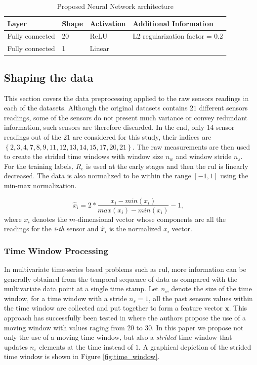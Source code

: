 \begin{table}[!htb]
\centering
\begin{tabular}{l l l l}
	\hline
	Layer & Shape & Activation & Additional Information\\
  	\hline
  	Fully connected & 20 & ReLU & L2 regularization factor = 0.2\\
  	Fully connected & 1 & Linear & \\
  	\hline
\end{tabular}
\caption{Proposed Neural Network architecture}
\label{table:proposed_nn}
\end{table}

\subsection{Shaping the data}

This section covers the data preprocessing applied to the raw sensors readings in each of the datasets. Although the original datasets contains $21$ different sensors readings, some of the sensors do not present much variance or convey redundant information, such sensors are therefore discarded. In the end, only $14$ sensor readings out of the $21$ are considered for this study, their indices are $\left\lbrace 2, 3, 4, 7, 8, 9, 11, 12, 13, 14, 15, 17, 20, 21 \right\rbrace$. The raw measurements are then used to create the strided time windows with window size $n_w$ and window stride $n_s$. For the training labels, $R_e$ is used at the early stages and then the \gls{rul} is linearly decreased. The data is also normalized to be within the range $\left[ -1,1 \right]$ using the min-max normalization.

\begin{equation}
\hat{x}_i = 2* \frac{x_i - min(x_i)}{max(x_i) - min(x_i)} - 1,
\label{eq:min_max_norm}
\end{equation}
where $x_i$ denotes the $m$-dimensional vector whose components are all the readings for the \textit{i-th} sensor and $\hat{x}_i$ is the normalized $x_i$ vector.

\subsubsection{Time Window Processing}

In multivariate time-series based problems such as \gls{rul}, more information can be generally obtained from the temporal sequence of data as compared with the multivariate data point at a single time stamp. Let $n_w$ denote the size of the time window, for a time window with a stride $n_s = 1$, all the past sensors values within the time window are collected and put together to form a feature vector $\mathbf{x}$. This approach has successfully been tested in \citep{Li2018, Lim2016} where the authors propose the use of a moving window with values raging from 20 to 30. In this paper we propose not only the use of a moving time window, but also a \textit{strided} time window that updates $n_s$ elements at the time instead of $1$. A graphical depiction of the strided time window is shown in Figure \ref{fig:time_window}.


